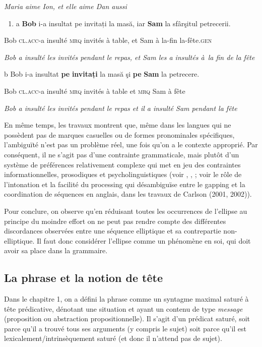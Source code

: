 {\itshape
    Maria aime Ion, et elle aime Dan aussi} 


\begin{enumerate}
\item \label{bkm:Ref302553090}a  \textbf{Bob}  i-a  insultat  pe  invitați  la  masă,  iar  \textbf{Sam}  la  sfârşitul  petrecerii. 


\end{enumerate}
Bob  \textsc{cl.acc}-a  insulté  \textsc{mrq}  invités  à  table,  et  Sam  à  la-fin  la-fête.\textsc{gen}

{\itshape
Bob a insulté les invités pendant le repas, et Sam les a insultés à~la fin de la fête}

b  Bob  i-a  insultat  \textbf{pe}  \textbf{invitați}  la  masă  şi  \textbf{pe}  \textbf{Sam}  la  petrecere.

Bob  \textsc{cl.acc}-a  insulté  \textsc{mrq}  invités  à  table  et  \textsc{mrq}  Sam  à  fête

{\itshape
    Bob a insulté les invités pendant le repas et il a insulté Sam pendant la fête}

En même temps, les travaux montrent que, même dans les langues qui ne possèdent pas de marques casuelles ou de formes pronominales spécifiques, l'ambiguïté n'est pas un problème réel, une fois qu'on a le contexte approprié. Par conséquent, il ne s'agit pas d'une contrainte grammaticale, mais plutôt d'un système de préférences relativement complexe qui met en jeu des contraintes informationnelles, prosodiques et psycholinguistiques (voir \citet{Hankamer1973}, \citet{Kuno1976}, \citet{Carlson2002} ; voir le rôle de l'intonation et la facilité du processing qui désambiguïse entre le gapping et la coordination de séquences en anglais, dans les travaux de Carlson (2001, 2002)). 

Pour conclure, on observe qu'en réduisant toutes les occurrences de l'ellipse au principe du moindre effort on ne peut pas rendre compte des différentes discordances observées entre une séquence elliptique et sa contrepartie non-elliptique. Il faut donc considérer l'ellipse comme un phénomène en soi, qui doit avoir sa place dans la grammaire.

\subsection{La phrase et la notion de tête}
Dans le chapitre 1, on a défini la phrase comme un syntagme maximal saturé à tête prédicative, dénotant une situation et ayant un contenu de type \textit{message} (proposition ou abstraction propositionnelle). Il s'agit d'un prédicat saturé, soit parce qu'il a trouvé tous ses arguments (y compris le sujet) soit parce qu'il est lexicalement/intrinsèquement saturé (et donc il n'attend pas de sujet). 


